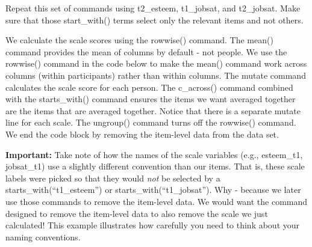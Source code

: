 \documentclass[
]{krantz}
\begin{document}
Repeat this set of commands using t2\_esteem, t1\_jobsat, and t2\_jobsat. Make sure that those start\_with() terms select only the relevant items and not others.

We calculate the scale scores using the rowwise() command. The mean() command provides the mean of columns by default - not people. We use the rowwise() command in the code below to make the mean() command work across columns (within participants) rather than within columns. The mutate command calculates the scale score for each person. The c\_across() command combined with the starts\_with() command ensures the items we want averaged together are the items that are averaged together. Notice that there is a separate mutate line for each scale. The ungroup() command turns off the rowwise() command. We end the code block by removing the item-level data from the data set.

\textbf{Important:} Take note of how the names of the scale variables (e.g., esteem\_t1, jobsat\_t1) use a slightly different convention than our items. That is, these scale labels were picked so that they would \emph{not} be selected by a starts\_with(``t1\_esteem'') or starts\_with(``t1\_jobsat''). Why - because we later use those commands to remove the item-level data. We would want the command designed to remove the item-level data to also remove the scale we just calculated! This example illustrates how carefully you need to think about your naming conventions.
\end{document}
